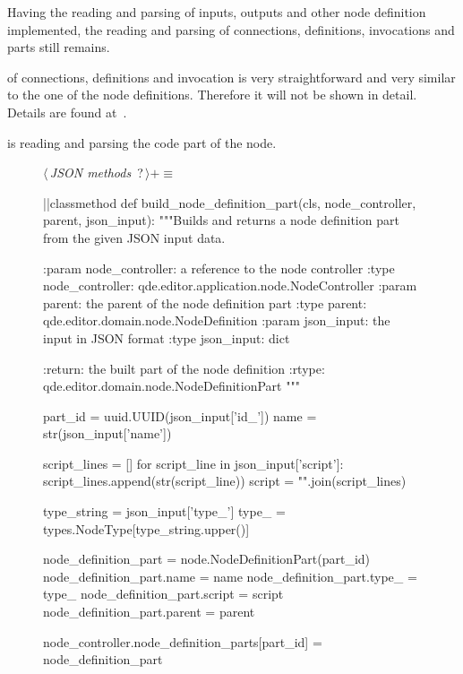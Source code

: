 \documentclass[%
    a4paper,    %
    justified,  %
    nobib,      %
    openany     %
]{tufte-book}
\makeatletter
\renewcommand{\label}[1]{\@tufte@label{##1}}%
\makeatother
\begin{document}
Having the reading and parsing of inputs, outputs and other node definition
implemented, the reading and parsing of connections, definitions, invocations
and parts still remains.

 of connections, definitions and invocation
is very straightforward and very similar to the one of the node definitions.
Therefore it will not be shown in detail. Details are found at~.

 is reading and parsing
the code part of the node.

\begin{figure}
\begin{flushleft} \small
\begin{minipage}{\linewidth}\label{scrap145}\raggedright\small
{} $\langle\,${\itshape JSON methods}\nobreak\ {\footnotesize {?}}$\,\rangle+\equiv$
\vspace{-1ex}
\begin{pythoncode}
|\normalfont{}\fontfamily{}|classmethod
def build_node_definition_part(cls, node_controller, parent, json_input):
    """Builds and returns a node definition part from the given JSON input data.

    :param node_controller: a reference to the node controller
    :type  node_controller: qde.editor.application.node.NodeController
    :param parent: the parent of the node definition part
    :type  parent: qde.editor.domain.node.NodeDefinition
    :param json_input: the input in JSON format
    :type  json_input: dict

    :return: the built part of the node definition
    :rtype:  qde.editor.domain.node.NodeDefinitionPart
    """

    part_id         = uuid.UUID(json_input['id_'])
    name            = str(json_input['name'])

    script_lines = []
    for script_line in json_input['script']:
        script_lines.append(str(script_line))
    script = "\n".join(script_lines)

    type_string = json_input['type_']
    type_ = types.NodeType[type_string.upper()]

    node_definition_part = node.NodeDefinitionPart(part_id)
    node_definition_part.name = name
    node_definition_part.type_ = type_
    node_definition_part.script = script
    node_definition_part.parent = parent

    node_controller.node_definition_parts[part_id] = node_definition_part


\end{pythoncode}
\end{minipage}
\end{flushleft}
\end{figure}
\end{document}
